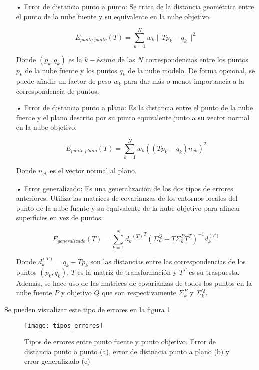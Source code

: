 \begin{itemize}
\item[•]Error de distancia punto a punto:
Se trata de la distancia geométrica entre el punto de la nube fuente y su equivalente en la nube objetivo.

$$E_{punto\_punto}(T)=\sum_{k=1}^{N} w_{k}\| Tp_{k}-q_{k} \|^2$$

Donde $(p_{k},q_{k})$ es la $k-ésima$ de las $N$ correspondencias entre los puntos $p_k$ de la nube fuente y los puntos $q_k$ de la nube modelo. De forma opcional, se puede añadir un factor de peso $w_k$ para dar más o menos importancia a la correspondencia de puntos.

\item[•]Error de distancia punto a plano:
Es la distancia entre el punto de la nube fuente y el plano descrito por su punto equivalente junto a su vector normal en la nube objetivo.

$$E_{punto\_plano}(T)=\sum_{k=1}^{N} w_{k} ((Tp_{k}-q_{k})n_{qk}) ^2$$

Donde $n_{qk}$ es el vector normal al plano.

\item[•]Error generalizado:
Es una generalización de los dos tipos de errores anteriores. Utiliza las matrices de covarianzas de los entornos locales del punto de la nube fuente y su equivalente de la nube objetivo para alinear superficies en vez de puntos.

$$E_{generalizado}(T)=\sum_{k=1}^{N} {{d_{k}}^{(T)}}^{T} (\Sigma_{k}^{Q}+T\Sigma_{k}^{P}T^{T})^{-1}d_{k}^{(T)}$$

Donde $d_{k}^{(T)}=q_{k}-Tp_{k}$ son las distancias entre las correspondencias de los puntos $(p_{k},q_{k})$, $T$ es la matriz de transformación y $T^T$ es su traspuesta. Además, se hace uso de las matrices de covarianzas de todos los puntos en la nube fuente $P$ y objetivo $Q$ que son respectivamente $\Sigma_{k}^{P}$ y $\Sigma_{k}^{Q}$.

\end{itemize}

Se pueden visualizar este tipo de errores en la figura \ref{fig:tipos_errores} 

\begin{figure}
\centering
\texttt{[image: tipos\_errores]}
\caption{Tipos de errores entre punto fuente y punto objetivo. Error de distancia punto a punto (a), error de distnacia punto a plano (b) y error generalizado (c)}\label{fig:tipos_errores}
\end{figure}

